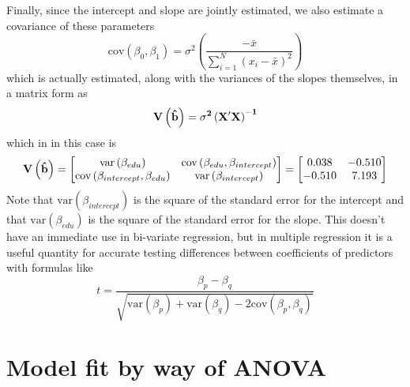 Finally, since the intercept and slope are jointly estimated, we also estimate a covariance of these parameters
\begin{equation}
\mbox{cov}\left(\beta_0,\beta_1\right)=\sigma^2\left(\frac{-\bar{x}}{\sum_{i=1}^N\left(x_i-\bar{x}\right)^2}\right)
\end{equation}
which is actually estimated, along with the variances of the slopes themselves, in a matrix form as
\begin{equation}\label{eq:olsmatrixvar}
\bf V\left(\hat{b}\right) = \sigma^2\left(X'X\right)^{-1}
\end{equation}
which in in this case is
\[
\bf V\left(\hat{b}\right) =
\begin{bmatrix}
\mbox{var}\left(\beta_{edu}\right) & \mbox{cov}\left(\beta_{edu},\beta_{intercept}\right) \\
\mbox{cov}\left(\beta_{intercept},\beta_{edu}\right) & \mbox{var}\left(\beta_{intercept}\right) \\
\end{bmatrix}
=
\begin{bmatrix}
0.038 & -0.510 \\
-0.510 & 7.193 \\
\end{bmatrix}
\]
Note that $\mbox{var}\left(\beta_{intercept}\right)$ is the square of the standard error for the intercept and that $\mbox{var}\left(\beta_{edu}\right)$ is the square of the standard error for the slope. This doesn't have an immediate use in bi-variate regression, but in multiple regression it is a useful quantity for accurate testing differences between coefficients of predictors with formulas like
\begin{equation}
t=\frac{\beta_p-\beta_q}{\sqrt{\mbox{var}\left(\beta_p\right)+\mbox{var}\left(\beta_q\right)-2\mbox{cov}\left(\beta_p,\beta_q\right)}}
\end{equation}
\section{Model fit by way of ANOVA}

